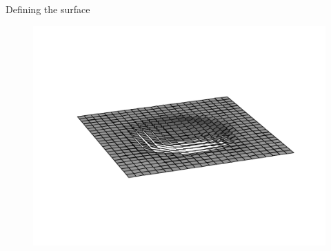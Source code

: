 \documentclass{beamer}
\begin{document}
\begin{frame}{Defining the surface}
\begin{figure}
\includegraphics[width=1\linewidth, trim={30mm 47mm 22mm 48mm}, clip]{figures/forceDistribution/surface/approximation23_5.pdf}
\end{figure}
\end{frame}
\end{document}
